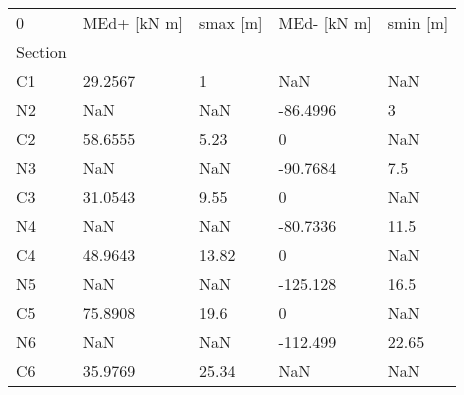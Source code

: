 \begin{tabular}{lllll}
\toprule
0 & MEd+ [kN m] & smax [m] & MEd- [kN m] & smin [m] \\
Section &             &          &             &          \\
\midrule
C1      &     29.2567 &        1 &         NaN &      NaN \\
N2      &         NaN &      NaN &    -86.4996 &        3 \\
C2      &     58.6555 &     5.23 &           0 &      NaN \\
N3      &         NaN &      NaN &    -90.7684 &      7.5 \\
C3      &     31.0543 &     9.55 &           0 &      NaN \\
N4      &         NaN &      NaN &    -80.7336 &     11.5 \\
C4      &     48.9643 &    13.82 &           0 &      NaN \\
N5      &         NaN &      NaN &    -125.128 &     16.5 \\
C5      &     75.8908 &     19.6 &           0 &      NaN \\
N6      &         NaN &      NaN &    -112.499 &    22.65 \\
C6      &     35.9769 &    25.34 &         NaN &      NaN \\
\bottomrule
\end{tabular}
